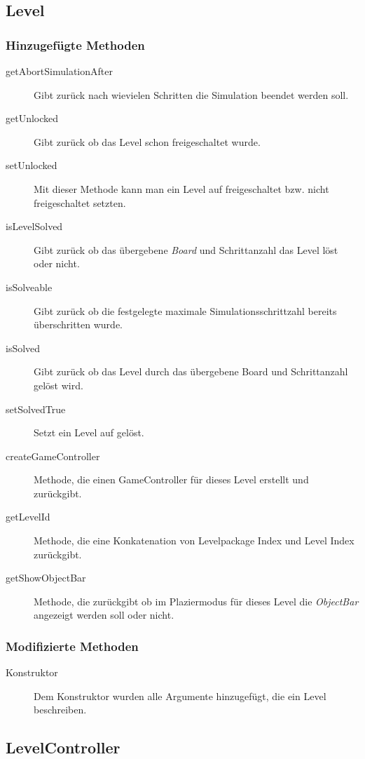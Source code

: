 \subsection{Level}

	\subsubsection{Hinzugefügte Methoden}
		\begin{description}
			\item[getAbortSimulationAfter] Gibt zurück nach wievielen Schritten die Simulation beendet werden soll.
			\item[getUnlocked] Gibt zurück ob das Level schon freigeschaltet wurde.
			\item[setUnlocked] Mit dieser Methode kann man ein Level auf freigeschaltet bzw. nicht freigeschaltet setzten.
			\item[isLevelSolved] Gibt zurück ob das übergebene \emph{Board} und Schrittanzahl 
				das Level löst oder nicht.
			\item[isSolveable] Gibt zurück ob die festgelegte maximale Simulationsschrittzahl bereits 
				überschritten wurde.
			\item[isSolved]Gibt zurück ob das Level durch das übergebene Board und Schrittanzahl gelöst wird.
			\item[setSolvedTrue] Setzt ein Level auf gelöst.
			\item[createGameController] Methode, die einen GameController für dieses Level erstellt und zurückgibt.
			\item[getLevelId] Methode, die eine Konkatenation von Levelpackage Index und Level Index zurückgibt.
			\item[getShowObjectBar] Methode, die zurückgibt ob im Plaziermodus für dieses Level die \emph{ObjectBar} 
				angezeigt werden soll oder nicht.
		\end{description}
	\subsubsection{Modifizierte Methoden}
		\begin{description}
			\item[Konstruktor] Dem Konstruktor wurden alle Argumente hinzugefügt, die ein Level beschreiben.
		\end{description}

\subsection{LevelController}

